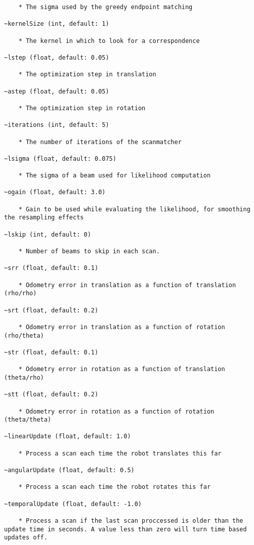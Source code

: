 \begin{verbatim}
    * The sigma used by the greedy endpoint matching 

~kernelSize (int, default: 1)

    * The kernel in which to look for a correspondence 

~lstep (float, default: 0.05)

    * The optimization step in translation 

~astep (float, default: 0.05)

    * The optimization step in rotation 

~iterations (int, default: 5)

    * The number of iterations of the scanmatcher 

~lsigma (float, default: 0.075)

    * The sigma of a beam used for likelihood computation 

~ogain (float, default: 3.0)

    * Gain to be used while evaluating the likelihood, for smoothing the resampling effects 

~lskip (int, default: 0)

    * Number of beams to skip in each scan. 

~srr (float, default: 0.1)

    * Odometry error in translation as a function of translation (rho/rho) 

~srt (float, default: 0.2)

    * Odometry error in translation as a function of rotation (rho/theta) 

~str (float, default: 0.1)

    * Odometry error in rotation as a function of translation (theta/rho) 

~stt (float, default: 0.2)

    * Odometry error in rotation as a function of rotation (theta/theta) 

~linearUpdate (float, default: 1.0)

    * Process a scan each time the robot translates this far 

~angularUpdate (float, default: 0.5)

    * Process a scan each time the robot rotates this far 

~temporalUpdate (float, default: -1.0)

    * Process a scan if the last scan proccessed is older than the update time in seconds. A value less than zero will turn time based updates off. 


\end{verbatim}
